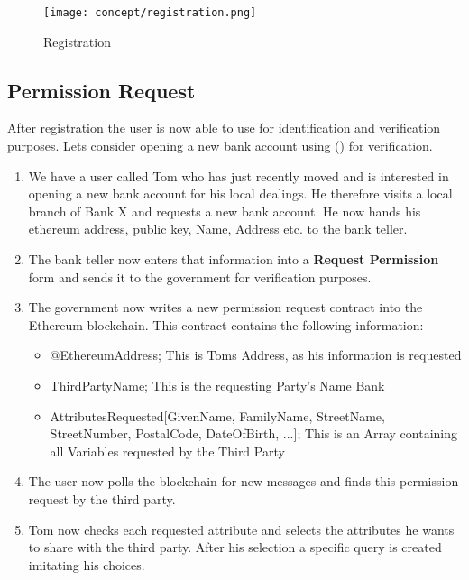 \begin{figure}[ht]
\centering
\texttt{[image: concept/registration.png]}
\caption{Registration}
\label{fig:registration_concept}
\end{figure}

\subsection{Permission Request}
After registration the user is now able to use \projectName{} for identification and verification purposes. Lets consider opening a new bank account using \projectName() for verification.



\begin{enumerate}
\item \label{permission_request_item_one}
We have a user called Tom who has just recently moved and is interested in opening a new bank account for his local dealings. He therefore visits a local branch of Bank X and requests a new bank account. He now hands his ethereum address, public key, Name, Address etc. to the bank teller.
\item \label{permission_request_item_two}
The bank teller now enters that information into a \textbf{Request Permission} form and sends it to the government for verification purposes.
\item \label{permission_request_item_three}
The government now writes a new permission request contract into the Ethereum blockchain. This contract contains the following information:
\begin{itemize}
\item @EthereumAddress; This is Toms Address, as his information is requested
\item ThirdPartyName; This is the requesting Party's Name Bank 
\item AttributesRequested[GivenName, FamilyName, StreetName, StreetNumber, PostalCode, DateOfBirth, ...]; This is an Array containing all Variables requested by the Third Party
\end{itemize}
\item \label{permission_request_item_four}
The user now polls the blockchain for new messages and finds this permission request by the third party.
\item \label{permission_request_item_five}
Tom now checks each requested attribute and selects the attributes he wants to share with the third party. After his selection a specific query is created imitating his choices.
\end{enumerate}

